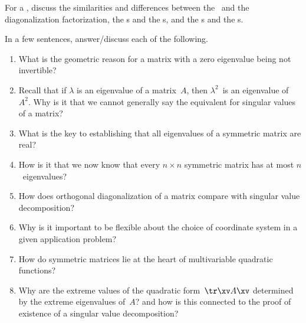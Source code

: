 \begin{exercise}  
For a , discuss the similarities and differences between the \svd\ and the diagonalization factorization, the s and the s, and the s and the s.
\end{exercise}



\begin{exercise}  
In a few sentences, answer\slash discuss each of the following.
\begin{enumerate}
\item What is the geometric reason for a matrix with a zero eigenvalue being not invertible?

\item Recall that if \(\lambda\) is an eigenvalue of a matrix~\(A\), then \(\lambda^2\)~is an eigenvalue of~\(A^2\).
Why is it that we cannot generally say the equivalent for singular values of a matrix?

\item What is the key to establishing that all eigenvalues of a symmetric matrix are real?

\item How is it that we now know that every \(n\times n\) symmetric matrix has at most \(n\)~eigenvalues?

\item How does orthogonal diagonalization of a matrix compare with singular value decomposition?

\item Why is it important to be flexible about the choice of coordinate system in a given application problem?

\item How do symmetric matrices lie at the heart of multivariable quadratic functions?

\item Why are the extreme values of the quadratic form~\(\tr\xv A\xv\) determined by the extreme eigenvalues of~\(A\)? and how is this connected to the proof of existence of a singular value decomposition?

\end{enumerate}
\end{exercise}

\begin{comment}%
why, what caused X?
how did X occur?
what-if? what-if-not?
how does X compare with Y?
what is the evidence for X?
why is X important?
\end{comment}


